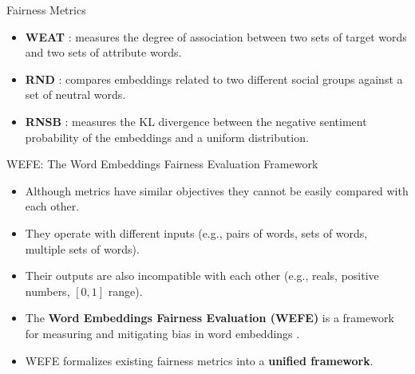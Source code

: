 \documentclass[handout]{beamer}
\begin{document}
\begin{frame}{Fairness Metrics}
\begin{scriptsize}

\begin{itemize}
 \item \textbf{WEAT} \cite{caliskan2017semantics}:  measures the degree of association between two sets of target words and two sets of attribute words.


\item \textbf{RND} \cite{garg2018word}: compares embeddings related to two different social groups against a set of neutral words.

\item \textbf{RNSB} \cite{sweeney2019transparent}:  measures the KL divergence between the negative sentiment probability of the embeddings and a uniform distribution.
\end{itemize}






\end{scriptsize}
\end{frame}


\begin{frame}{WEFE: The Word Embeddings Fairness Evaluation Framework}
\begin{scriptsize}
\begin{itemize}
\item Although metrics have similar objectives they cannot be easily compared with each other.
\item They operate with different inputs (e.g., pairs of words, sets of words, multiple sets of words).
\item Their outputs are also incompatible with each other (e.g., reals, positive numbers, $[0,1]$ range).
 \item The \textbf{Word Embeddings Fairness Evaluation (WEFE)} is a framework for measuring and mitigating bias in word embeddings \cite{badilla2020wefe}.

 \item  WEFE formalizes existing fairness metrics into a \textbf{unified framework}.
\end{itemize}

\end{scriptsize}
\end{frame}
\end{document}
